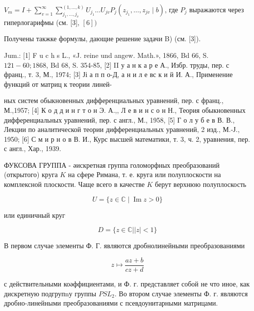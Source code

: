 \documentclass[10pt]{article}
\begin{document}
$V_{m}=I+\sum_{v=1}^{\infty} \sum_{j_{1}, \ldots, j_{v}}^{(1, \ldots, k)} U_{j_{1}} \ldots U_{j v} P_{j}\left(z_{j_{1}}, \ldots, z_{j v} \mid b\right)$, где $P_{j}$ выражаются через гиперлогарифмы (см. [3], $[6])$



Получены такжке формулы, дающие решение задачи B) (см. [3]).



Jum.: [1] F u c h s L., «J. reine und angew. Math.», 1866, Bd 66, S. $121-60 ; 1868$, Bd 68, S. 354-85, [2] II у а н к а р е А., Избр. труды, пер. с франц., т. 3, М., 1974; [3] Јі а п п о-Д, а н и л е вс к и й И. А., Применение функций от матриц к теории линей-

ных систем обыкновенных дифференциальных уравнений, пер. с франц., М.,1957; [4] К о д д и н г т о н Э. А.,, Л е в и н с о н Н., Теория обыкновенных дифференциальных уравнений, пер. с англ., М., 1958, [5] Г о л у б е в В. В., Лекции по аналитической теории дифференциальных уравнений, 2 изд., М.-Ј., 1950; [6] С м и р н о в В. И., Курс высшей математики, т. 3, ч. 2, уравнения, пер. с англ., Хар., 1939.



ФУКСОВА ГРУППА - әискретная группа голоморфных преобразований (открытого) круга $K$ на сфере Римана, т. е. круга или полуплоскости на комплексной плоскости. Чаще всего в качестве $K$ берут верхнюю полуплоскость



\[

U=\{z \in \mathbb{C} \mid \operatorname{Im} z>0\}

\]



или единичный круг



\[

D=\{z \in \mathbb{C}|| z \mid<1\}

\]



В первом случае элементы Ф. Г. являются дробнолинейными преобразованиями



\[

z \longmapsto \frac{a z+b}{c z+d}

\]



с действительными коәффициентами, и Ф. г. представляет собой не что иное, как дискретную подгрупnу группы $P S L_{2}$. Во втором случае элементы Ф. г. являются дробно-линейными преобразованиями с псевдоунитарными матрицами.
\end{document}
